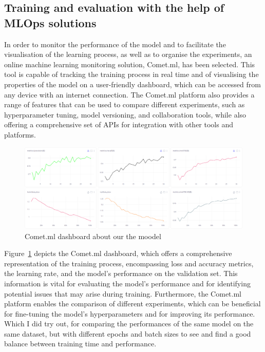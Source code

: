 \subsection{Training and evaluation with the help of MLOps solutions}\label{subsec:training-and-evaluation-with-the-help-of-mlops-solutions}
In order to monitor the performance of the model and to facilitate the visualisation of the learning process,
as well as to organise the experiments, an online machine learning monitoring solution, Comet.ml, has been selected.
This tool is capable of tracking the training process in real time and of visualising the properties of the model on
a user-friendly dashboard, which can be accessed from any device with an internet connection.
The Comet.ml platform also provides a range of features that can be used to compare different experiments,
such as hyperparameter tuning, model versioning, and collaboration tools, while also offering a comprehensive
set of APIs for integration with other tools and platforms.

\begin{figure}[ht]
\centering
\includegraphics[width=1.0\textwidth]{figures/model}
\caption{Comet.ml dashboard about our the moodel}
\label{fig:comet}
\end{figure}

Figure~\ref{fig:comet} depicts the Comet.ml dashboard, which offers a comprehensive representation of the training process,
encompassing loss and accuracy metrics, the learning rate, and the model's performance on the validation set.
This information is vital for evaluating the model's performance and for identifying potential issues that may arise during training.
Furthermore, the Comet.ml platform enables the comparison of different experiments,
which can be beneficial for fine-tuning the model's hyperparameters and for improving its performance.
Which I did try out, for comparing the performances of the same model on the same dataset,
but with different epochs and batch sizes to see and find a good balance between training time and performance.